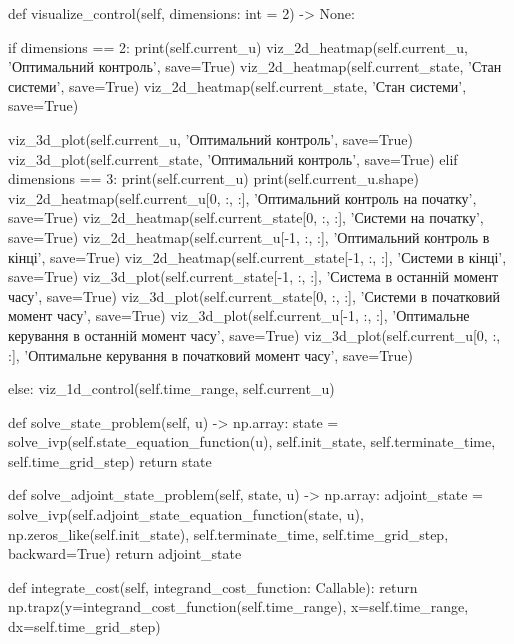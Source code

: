 \documentclass[a4paper,12pt]{extreport}
\begin{document}
\begin{python}[utf8]
        def visualize_control(self, dimensions: int = 2) -> None:
    
            if dimensions == 2:
                print(self.current_u)
                viz_2d_heatmap(self.current_u, 'Оптимальний контроль', save=True)
                viz_2d_heatmap(self.current_state, 'Стан системи', save=True)
                viz_2d_heatmap(self.current_state, 'Стан системи', save=True)
    
                viz_3d_plot(self.current_u, 'Оптимальний контроль', save=True)
                viz_3d_plot(self.current_state, 'Оптимальний контроль', save=True)
            elif dimensions == 3:
                print(self.current_u)
                print(self.current_u.shape)
                viz_2d_heatmap(self.current_u[0, :, :], 'Оптимальний контроль на початку', save=True)
                viz_2d_heatmap(self.current_state[0, :, :], 'Системи на початку', save=True)
                viz_2d_heatmap(self.current_u[-1, :, :], 'Оптимальний контроль в кінці', save=True)
                viz_2d_heatmap(self.current_state[-1, :, :], 'Системи в кінці', save=True)
                viz_3d_plot(self.current_state[-1, :, :], 'Система в останній момент часу', save=True)
                viz_3d_plot(self.current_state[0, :, :], 'Системи в початковий момент часу', save=True)
                viz_3d_plot(self.current_u[-1, :, :], 'Оптимальне керування в останній момент часу', save=True)
                viz_3d_plot(self.current_u[0, :, :], 'Оптимальне керування в початковий момент часу', save=True)
    
            else:
                viz_1d_control(self.time_range, self.current_u)
    
        def solve_state_problem(self, u) -> np.array:
            state = solve_ivp(self.state_equation_function(u), self.init_state, self.terminate_time, self.time_grid_step)
            return state
    
        def solve_adjoint_state_problem(self, state, u) -> np.array:
            adjoint_state = solve_ivp(self.adjoint_state_equation_function(state, u), np.zeros_like(self.init_state),
                                      self.terminate_time, self.time_grid_step, backward=True)
            return adjoint_state
    
        def integrate_cost(self, integrand_cost_function: Callable):
            return np.trapz(y=integrand_cost_function(self.time_range), x=self.time_range, dx=self.time_grid_step)
    
    
\end{python}
\end{document}
